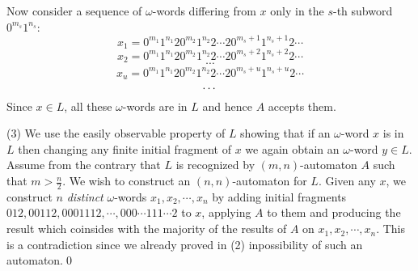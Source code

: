 \documentclass{llncs}
\begin{document}
Now consider a sequence of $\omega$-words differing from $x$ only in the $s$-th subword $0^{m_s}1^{n_s}$:
$$
x_1 = 0^{m_1}1^{n_1}20^{m_2}1^{n_2}2\cdots 20^{m_s+1}1^{n_s+1}2\cdots 
$$
$$
x_2 = 0^{m_1}1^{n_1}20^{m_2}1^{n_2}2\cdots 20^{m_s+2}1^{n_s+2}2\cdots 
$$
$$
\cdots 
$$
$$
x_u = 0^{m_1}1^{n_1}20^{m_2}1^{n_2}2\cdots 20^{m_s+u}1^{n_s+u}2\cdots 
$$
$$
\cdots \\
$$
Since $x \in L$, all these $\omega $-words are in $L$ and hence $A$ accepts them. 













\bigskip

(3) We use the easily observable property of $L$ showing that if an $\omega $-word $x$ is in $L$ then changing any finite initial fragment of $x$ we again obtain an $\omega $-word $y \in L$. Assume from the contrary that $L$ is recognized by  $(m,n)$-automaton $A$ such that $m > \frac{n}{2}$. We wish to construct an 
$(n,n)$-automaton for $L$. Given any $x$, we construct $n$ {\em distinct} $\omega $-words $x_1, x_2, \cdots , x_n$ by adding initial fragments
$012, 00112, 0001112, \cdots , 000\cdots 111\cdots 2$ to $x$, applying $A$ to them and producing the result which coinsides with the majority of the results of
$A$ on $x_1, x_2, \cdots , x_n$. This is a contradiction since we already proved in (2) inpossibility of such an automaton.\qed
\end{document}
